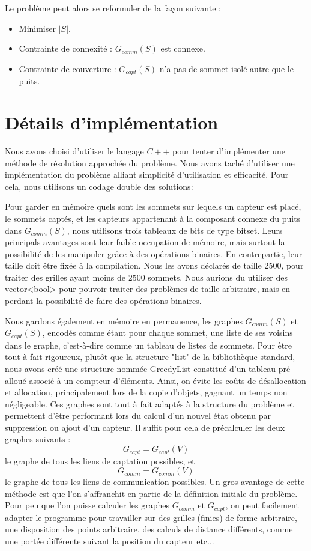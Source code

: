 \documentclass[12pt,a4paper]{article}
\begin{document}
Le problème peut alors se reformuler de la façon suivante :
\begin{itemize}
\item Minimiser $|S|$.
\item Contrainte de connexité : $G_{comm}(S)$ est connexe.
\item Contrainte de couverture : $G_{capt}(S)$ n'a pas de sommet isolé autre que le puits.
\end{itemize}
\section{Détails d'implémentation}
Nous avons choisi d'utiliser le langage $C++$ pour tenter d'implémenter une méthode de résolution approchée du problème. Nous avons taché d'utiliser une implémentation du problème alliant simplicité d'utilisation et efficacité. Pour cela, nous utilisons un codage double des solutions:

Pour garder en mémoire quels sont les sommets sur lequels un capteur est placé, le sommets captés, et les capteurs appartenant à la composant connexe du puits dans $G_{comm}(S)$, nous utilisons trois tableaux de bits de type bitset. Leurs principals avantages sont leur faible occupation de mémoire, mais surtout la possibilité de les manipuler grâce à des opérations binaires. En contrepartie, leur taille doit être fixée à la compilation. Nous les avons déclarés de taille $2500$, pour traiter des grilles ayant moins de $2500$ sommets. Nous aurions du utiliser des vector<bool> pour pouvoir traiter des problèmes de taille arbitraire, mais en perdant la possibilité de faire des opérations binaires.

Nous gardons également en mémoire en permanence, les graphes $G_{comm}(S)$ et $G_{capt}(S)$, encodés comme étant pour chaque sommet, une liste de ses voisins dans le graphe, c'est-à-dire comme un tableau de listes de sommets. Pour être tout à fait rigoureux, plutôt que la structure "list" de la bibliothèque standard, nous avons créé une structure nommée GreedyList constitué d'un tableau pré-alloué associé à un compteur d'éléments. Ainsi, on évite les coûts de désallocation et allocation, principalement lors de la copie d'objets, gagnant un temps non négligeable. Ces graphes sont tout à fait  adaptés à la structure du problème et permettent d'être performant lors du calcul d'un nouvel état obtenu par suppression ou ajout d'un capteur. Il suffit pour cela de précalculer les deux graphes suivants : 
\[G_{capt}=G_{capt}(V)\]
 le graphe de tous les liens de captation possibles, et
\[G_{comm}=G_{comm}(V)\] 
le graphe de tous les liens de communication possibles. Un gros avantage de cette méthode est que l'on s'affranchit en partie de la définition initiale du problème. Pour peu que l'on puisse calculer les graphes $G_{comm}$ et $G_{capt}$, on peut facilement adapter le programme pour travailler sur des grilles (finies) de forme arbitraire, une disposition des points arbitraire, des calculs de distance différents, comme une portée différente suivant la position du capteur etc...
\end{document}
